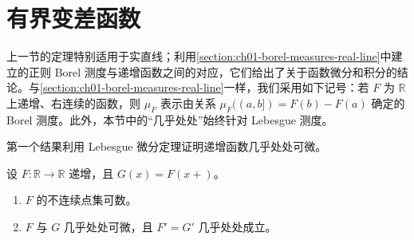 \documentclass[../../main.tex]{subfiles}%
\begin{document}
\section{有界变差函数}\label{section:ch03-bounded-variation}
上一节的定理特别适用于实直线；利用\cref{section:ch01-borel-measures-real-line}中建立的正则 Borel 测度与递增函数之间的对应，它们给出了关于函数微分和积分的结论。与\cref{section:ch01-borel-measures-real-line}一样，我们采用如下记号：若 $F$ 为 $\mathbb{R}$ 上递增、右连续的函数，则 $\mu_F$ 表示由关系 $\mu_F((a,b])=F(b)-F(a)$ 确定的 Borel 测度。此外，本节中的“几乎处处”始终针对 Lebesgue 测度。

第一个结果利用 Lebesgue 微分定理证明递增函数几乎处处可微。
\begin{theorem}\label{theorem:ch03-monotone-differentiability}
设 $F:\mathbb{R}\to\mathbb{R}$ 递增，且 $G(x)=F(x+)$。
\begin{enumerate}
\item\label{item:ch03-monotone-discontinuities} $F$ 的不连续点集可数。
\item\label{item:ch03-monotone-derivatives} $F$ 与 $G$ 几乎处处可微，且 $F'=G'$ 几乎处处成立。
\end{enumerate}
\end{theorem}
\end{document}
